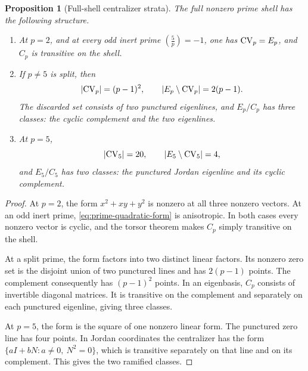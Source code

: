 \documentclass[11pt]{article}
\newtheorem{proposition}[theorem]{Proposition}
\theoremstyle{definition}
\theoremstyle{remark}
\begin{document}
\begin{proposition}[Full-shell centralizer strata]
\label{prop:prime-strata}
The full nonzero prime shell has the following structure.
\begin{enumerate}
  \item At \(p=2\), and at every odd inert prime
        \(\left(\frac5p\right)=-1\), one has \(\mathrm{CV}_p=E_p\), and \(C_p\)
        is transitive on the shell.
  \item If \(p\ne5\) is split, then
        \begin{equation}
          |\mathrm{CV}_p|=(p-1)^2,
          \qquad |E_p\setminus\mathrm{CV}_p|=2(p-1).
          \label{eq:split-counts}
        \end{equation}
        The discarded set consists of two punctured eigenlines, and
        \(E_p/C_p\) has three classes: the cyclic complement and the two
        eigenlines.
  \item At \(p=5\),
        \begin{equation}
          |\mathrm{CV}_5|=20,
          \qquad |E_5\setminus\mathrm{CV}_5|=4,
          \label{eq:ramified-counts}
        \end{equation}
        and \(E_5/C_5\) has two classes: the punctured Jordan eigenline and
        its cyclic complement.
\end{enumerate}
\end{proposition}

\begin{proof}
At \(p=2\), the form \(x^2+xy+y^2\) is nonzero at all three nonzero
vectors.  At an odd inert prime, \eqref{eq:prime-quadratic-form} is
anisotropic.  In both cases every nonzero vector is cyclic, and the torsor
theorem makes \(C_p\) simply transitive on the shell.

At a split prime, the form factors into two distinct linear factors.  Its
nonzero zero set is the disjoint union of two punctured lines and has
\(2(p-1)\) points.  The complement consequently has \((p-1)^2\) points.
In an eigenbasis, \(C_p\) consists of invertible diagonal matrices.  It is
transitive on the complement and separately on each punctured eigenline,
giving three classes.

At \(p=5\), the form is the square of one nonzero linear form.  The
punctured zero line has four points.  In Jordan coordinates the centralizer
has the form \(\{aI+bN:a\ne0,\ N^2=0\}\), which is transitive separately
on that line and on its complement.  This gives the two ramified classes.
\end{proof}
\end{document}
